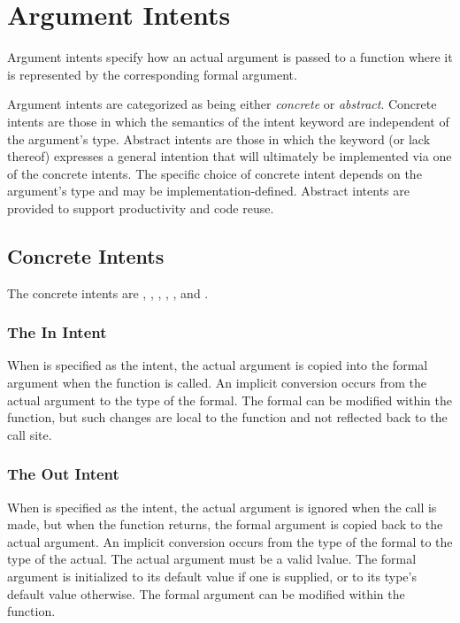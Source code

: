 \section{Argument Intents}
\label{Argument_Intents}

Argument intents specify how an actual argument is passed to a
function where it is represented by the corresponding formal argument.

Argument intents are categorized as being either \emph{concrete}
or \emph{abstract}.  Concrete intents are those in which the semantics
of the intent keyword are independent of the argument's type.
Abstract intents are those in which the keyword (or lack thereof)
expresses a general intention that will ultimately be implemented via
one of the concrete intents.  The specific choice of concrete intent
depends on the argument's type and may be implementation-defined.
Abstract intents are provided to support productivity and code reuse.

\subsection{Concrete Intents}
\label{Concrete Intents}

The concrete intents are , , ,
, , and .

\subsubsection{The In Intent}
\label{The_In_Intent}

When  is specified as the intent, the actual argument is
copied into the formal argument when the function is called.
An implicit conversion occurs from the actual argument
to the type of the formal.  The
formal can be modified within the function, but such changes are local
to the function and not reflected back to the call site.


\subsubsection{The Out Intent}
\label{The_Out_Intent}

When  is specified as the intent, the actual argument is
ignored when the call is made, but when the function returns, the
formal argument is copied back to the actual argument.
An implicit conversion occurs from the type of the formal
to the type of the actual.  The actual argument
must be a valid lvalue.  The formal
argument is initialized to its default value if one is supplied, or to
its type's default value otherwise.  The formal argument can be
modified within the function.


